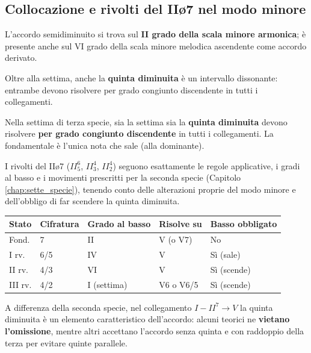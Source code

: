 \subsection{Collocazione e rivolti del IIø7 nel modo minore}
\label{subsec:rivolti_ii7_minore}

\begin{regola}
	\label{reg:collocazione_ii7_minore}
	L'accordo semidiminuito si trova sul \textbf{II grado della scala minore armonica}; è presente anche sul VI grado della scala minore melodica ascendente come accordo derivato.
\end{regola}

Oltre alla settima, anche la \textbf{quinta diminuita} è un intervallo dissonante: entrambe devono risolvere per grado congiunto discendente in tutti i collegamenti.

\begin{regola}
	\label{reg:quinta_diminuita}
	Nella settima di terza specie, sia la settima sia la \textbf{quinta diminuita} devono risolvere \textbf{per grado congiunto discendente} in tutti i collegamenti. La fondamentale è l'unica nota che sale (alla dominante).
\end{regola}

I rivolti del IIø7 ($II^6_5$, $II^4_3$, $II^4_2$) seguono esattamente le regole applicative, i gradi al basso e i movimenti prescritti per la seconda specie (Capitolo \ref{chap:sette_specie}), tenendo conto delle alterazioni proprie del modo minore e dell'obbligo di far scendere la quinta diminuita.

\begin{center}
\begin{tabular}{|l|l|l|l|l|}
\hline
Stato & Cifratura & Grado al basso & Risolve su & Basso obbligato \\
\hline
Fond. & 7 & II & V (o V7) & No \\
I rv. & 6/5 & IV & V & Sì (sale) \\
II rv. & 4/3 & VI & V & Sì (scende) \\
III rv. & 4/2 & I (settima) & V6 o V6/5 & Sì (scende) \\
\hline
\end{tabular}
\end{center}

\begin{osservazione}
	\label{oss:omissione_quinta}
	A differenza della seconda specie, nel collegamento $I - II^7 \rightarrow V$ la quinta diminuita è un elemento caratteristico dell'accordo: alcuni teorici ne \textbf{vietano l'omissione}, mentre altri accettano l'accordo senza quinta e con raddoppio della terza per evitare quinte parallele.
\end{osservazione}

